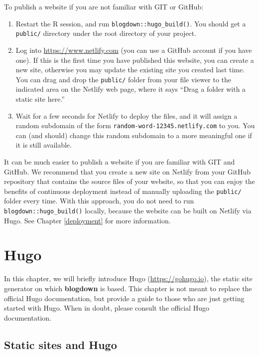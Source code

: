\documentclass[12pt,]{krantz}
\theoremstyle{definition}
\theoremstyle{definition}
\theoremstyle{definition}
\theoremstyle{remark}
\begin{document}
To publish a website if you are not familiar with GIT or GitHub:

\begin{enumerate}
\def\labelenumi{\arabic{enumi}.}
\item
  Restart the R session, and run \texttt{blogdown::hugo\_build()}. You
  should get a \texttt{public/} directory under the root directory of
  your project.
\item
  Log into \url{https://www.netlify.com} (you can use a
  GitHub account if you have one). If this is the first time you have
  published this website, you can create a new site, otherwise you may
  update the existing site you created last time. You can drag and drop
  the \texttt{public/} folder from your file viewer to the indicated
  area on the Netlify web page, where it says ``Drag a folder with a
  static site here.''
\item
  Wait for a few seconds for Netlify to deploy the files, and it will
  assign a random subdomain of the form
  \texttt{random-word-12345.netlify.com} to you. You can (and should)
  change this random subdomain to a more meaningful one if it is still
  available.
\end{enumerate}

It can be much easier to publish a website if you are familiar with GIT
and GitHub. We recommend that you create a new site on Netlify from your
GitHub repository that contains the source files of your website, so
that you can enjoy the benefits of continuous deployment instead of
manually uploading the \texttt{public/} folder every time. With this
approach, you do not need to run \texttt{blogdown::hugo\_build()}
locally, because the website can be built on Netlify via Hugo. See
Chapter \ref{deployment} for more information.

\chapter{Hugo}\label{hugo}

In this chapter, we will briefly introduce Hugo
(\url{https://gohugo.io}), the static site generator on which
\textbf{blogdown} is based. This chapter is not meant to replace the
official Hugo documentation, but provide a guide to those who are just
getting started with Hugo. When in doubt, please consult the official
Hugo documentation.

\section{Static sites and Hugo}\label{static-sites}
\end{document}
